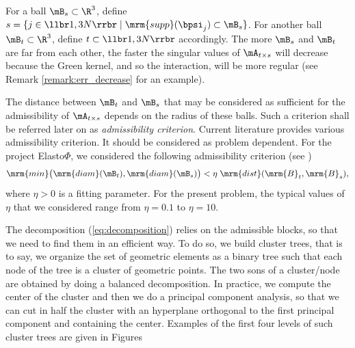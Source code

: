 For a ball $\mB_{s}\subset \R^{3}$, define $s = \{j \in\llbr 1,3N\rrbr\;\vert \;\mrm{supp}(\bpsi_{j})\subset \mB_{s}\}$. 
For another ball $\mB_{t}\subset \R^{3}$, define $t\subset \llbr1,3N\rrbr$ accordingly.  
The more $\mB_{s}$ and $\mB_{t}$ are far from each other, the faster the singular values of $\mA_{t \times s}$ will decrease because the Green kernel, and so the interaction, will be more regular (see Remark \ref{remark:err_decrease} for an example).

The distance between $\mB_{t}$ and $\mB_{s}$ that may be considered as sufficient for the admissibility of $\mA_{t \times s}$ depends on the radius of these balls. 
Such a criterion shall be referred later on as \textit{admissibility criterion}. Current literature provides various 
admissibility criterion. It should be considered as problem dependent. For the project Elasto$\Phi$, we considered the 
following admissibility criterion (see \cite{Rjasanow2007})
\begin{equation}\label{AdmissibilityCondition}
\mrm{min}\big( \mrm{diam}(\mB_{t}),\mrm{diam}(\mB_{s})\big)< \eta\;\mrm{dist}(\mrm{B}_{t},\mrm{B}_{s}),
\end{equation}
where $\eta>0$ is a fitting parameter. For the present problem, the typical values of $\eta$ that we considered  
range from $\eta = 0.1$ to $\eta = 10$. 

The decomposition (\ref{eq:decomposition}) relies on the admissible blocks, so that we need to find them in an efficient way. To do so, we build cluster trees, that is to say, we organize the set of geometric elements as a binary tree such that each node of the tree is a cluster of geometric points. The two sons of a cluster/node are obtained by doing a balanced decomposition. In practice, we compute the center of the cluster and then we do a principal component analysis, so that we can cut in half the cluster with an hyperplane orthogonal to the first principal component and containing the center. Examples of the first four levels of such cluster trees are given in Figures 

